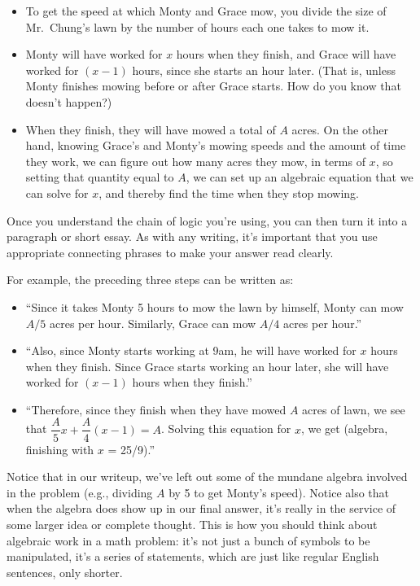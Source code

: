 \documentclass{article}
\begin{document}
\begin{itemize}

\item To get the speed at which Monty and Grace mow, you divide the size of Mr.\ Chung's lawn by the number of hours each one takes to mow it.

\item Monty will have worked for $x$ hours when they finish, and Grace will have worked for $(x-1)$ hours, since she starts an hour later. (That is, unless Monty finishes mowing before or after Grace starts. How do you know that doesn't happen?)

\item When they finish, they will have mowed a total of $A$ acres. On the other hand, knowing Grace's and Monty's mowing speeds and the amount of time they work, we can figure out how many acres they mow, in terms of $x$, so setting that quantity equal to $A$, we can set up an algebraic equation that we can solve for $x$, and thereby find the time when they stop mowing.

\end{itemize}

Once you understand the chain of logic you're using, you can then turn it into a paragraph or short essay. As with any writing, it's important that you use appropriate connecting phrases to make your answer read clearly.

For example, the preceding three steps can be written as:

\begin{itemize}

\item ``Since it takes Monty 5 hours to mow the lawn by himself, Monty can mow $A/5$ acres per hour. Similarly, Grace can mow $A/4$ acres per hour.''

\item ``Also, since Monty starts working at 9am, he will have worked for $x$ hours when they finish. Since Grace starts working an hour later, she will have worked for $(x-1)$ hours when they finish.''

\item ``Therefore, since they finish when they have mowed $A$ acres of lawn, we see that $\dfrac{A}{5}x + \dfrac{A}{4}(x-1) = A$. Solving this equation for $x$, we get (algebra, finishing with $x$ = 25/9).''

\end{itemize}

Notice that in our writeup, we've left out some of the mundane algebra involved in the problem (e.g., dividing $A$ by 5 to get Monty's speed). Notice also that when the algebra does show up in our final answer, it's really in the service of some larger idea or complete thought. This is how you should think about algebraic work in a math problem: it's not just a bunch of symbols to be manipulated, it's a series of statements, which are just like regular English sentences, only shorter.
\end{document}
